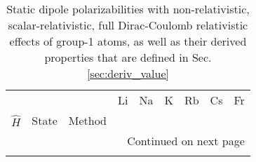\begin{longtable}{lllllllll}
\caption{Static dipole polarizabilities with non-relativistic, scalar-relativistic, full Dirac-Coulomb relativistic effects of group-1 atoms, as well as their derived properties that are defined in Sec. \ref{sec:deriv_value}}\label{tab:dipole_group_1}\\
\toprule
      &         &                                    &        Li &             Na &              K &             Rb &             Cs &             Fr \\
$\hat{H}$ & State & Method &           &                &                &                &                &                \\
\midrule
\endhead
\midrule
\multicolumn{9}{r}{{Continued on next page}} \\
\midrule
\endfoot


\end{longtable}
